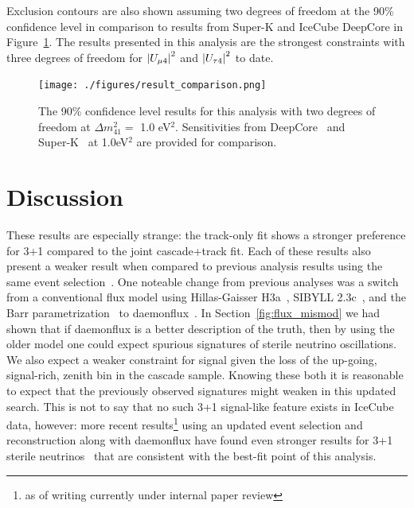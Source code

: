 \documentclass[main.tex]{subfiles}
\begin{document}
Exclusion contours are also shown assuming two degrees of freedom at the 90\% confidence level in comparison to results from Super-K and IceCube DeepCore in Figure~\ref{fig:comparison_results}. 
The results presented in this analysis are the strongest constraints with three degrees of freedom for $\left| U_{\mu 4} \right|^{2}$ and $\left| U_{\tau 4} \right|^{2}$ to date. 


\begin{figure}
    \centering
    \texttt{[image: ./figures/result\_comparison.png]}
    \caption{The 90\% confidence level results for this analysis with two degrees of freedom at $\Delta m_{41}^{2}=$ 1.0 eV$^{2}$. Sensitivities from DeepCore~\cite{Aartsen_2017_dc} and Super-K~\cite{PhysRevD.91.052019} at 1.0eV$^{2}$ are provided for comparison.}\label{fig:comparison_results}
\end{figure}    

\section{Discussion}

These results are especially strange: the track-only fit shows a stronger preference for 3+1 compared to the joint cascade+track fit. 
Each of these results also present a weaker result when compared to previous analysis results using the same event selection~\cite{Aartsen_2020, Aartsen_2020_prd}.
One noteable change from previous analyses was a switch from a conventional flux model using Hillas-Gaisser H3a~\cite{GAISSER2012801}, SIBYLL 2.3c~\cite{Riehn:2017mfm}, and the Barr parametrization~\cite{PhysRevD.74.094009} to daemonflux~\cite{yanez2023daemonflux}.
In Section~\ref{fig:flux_mismod} we had shown that if daemonflux is a better description of the truth, then by using the older model one could expect spurious signatures of sterile neutrino oscillations. 
We also expect a weaker constraint for signal given the loss of the up-going, signal-rich, zenith bin in the cascade sample. 
Knowing these both it is reasonable to expect that the previously observed signatures might weaken in this updated search. 
This is not to say that no such 3+1 signal-like feature exists in IceCube data, however: more recent results\footnote{as of writing currently under internal paper review} using an updated event selection and reconstruction along with daemonflux have found even stronger results for 3+1 sterile neutrinos~\cite{alfonso_slides} that are consistent with the best-fit point of this analysis.
\end{document}
